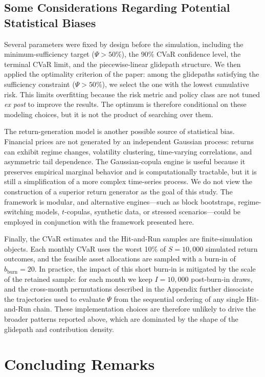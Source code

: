 \documentclass[11pt]{article}
\begin{document}
\subsection{Some Considerations Regarding Potential Statistical Biases}

Several parameters were fixed by design before the simulation, including the
minimum-sufficiency target ($\Psi > 50\%$), the $90\%$ CVaR confidence level,
the terminal CVaR limit, and the piecewise-linear glidepath structure. We then
applied the optimality criterion of the paper: among the glidepaths satisfying
the sufficiency constraint ($\Psi > 50\%$), we select the one with the lowest
cumulative risk. This limits overfitting because the risk metric and policy class
are not tuned \textit{ex post} to improve the results. The optimum is therefore conditional
on these modeling choices, but it is not the product of searching over them.

The return-generation model is another possible source of statistical bias.
Financial prices are not generated by an independent Gaussian process: returns
can exhibit regime changes, volatility clustering, time-varying correlations,
and asymmetric tail dependence. The Gaussian-copula engine is useful because
it preserves empirical marginal behavior and is computationally tractable, but
it is still a simplification of a more complex time-series process. We do not
view the construction of a superior return generator as the goal of this
study. The framework is modular, and alternative engines---such as block
bootstraps, regime-switching models, $t$-copulas, synthetic data, or stressed
scenarios---could be employed in conjunction with the framework presented here.

Finally, the CVaR estimates and the Hit-and-Run samples are finite-simulation objects. Each monthly CVaR uses the worst 10\% of $S=10{,}000$ simulated return outcomes, and the feasible asset allocations are sampled with a burn-in of $b_{\mathrm{burn}}=20$. In practice, the impact of this short burn-in is mitigated by the scale of the retained sample: for each month we keep $I=10{,}000$ post-burn-in draws, and the cross-month permutations described in the Appendix    further dissociate the trajectories used to evaluate $\Psi$ from the sequential ordering of any single Hit-and-Run chain. These implementation choices are therefore unlikely to drive the broader patterns reported above, which are dominated by the shape of the glidepath  and contribution density.

\section{Concluding Remarks}
\end{document}
